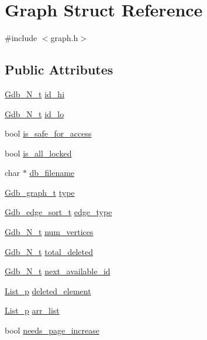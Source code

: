 \hypertarget{structGraph}{}\section{Graph Struct Reference}
\label{structGraph}


{\ttfamily \#include $<$graph.\+h$>$}

\subsection*{Public Attributes}
\begin{DoxyCompactItemize}
\item 
\hyperlink{primitives_8h_a859f3e5b0c42fd108b94dfb804f70440}{Gdb\+\_\+\+N\+\_\+t} \hyperlink{structGraph_a0224126d71d508a24e34f02cf646730b}{id\+\_\+hi}
\item 
\hyperlink{primitives_8h_a859f3e5b0c42fd108b94dfb804f70440}{Gdb\+\_\+\+N\+\_\+t} \hyperlink{structGraph_ab0318f9589f841d9a8bdad1413fddae5}{id\+\_\+lo}
\item 
bool \hyperlink{structGraph_ace0e0595c2240af59238f0767186a1b5}{is\+\_\+safe\+\_\+for\+\_\+access}
\item 
bool \hyperlink{structGraph_a1c7ee2bf3105480792f5b828c7c6b6f3}{is\+\_\+all\+\_\+locked}
\item 
char $\ast$ \hyperlink{structGraph_ac41ce58ccc9eee09e085dea4d8b28109}{db\+\_\+filename}
\item 
\hyperlink{primitives_8h_af1845dd201a1704a20a33f5b6c6e0fd2}{Gdb\+\_\+graph\+\_\+t} \hyperlink{structGraph_aa2ea9bdb6f466f17184c42a2dbca068f}{type}
\item 
\hyperlink{primitives_8h_aeaab1f0713a17e61d27d02e31f327be4}{Gdb\+\_\+edge\+\_\+sort\+\_\+t} \hyperlink{structGraph_abcebecd97e8916dd12100eb654754770}{edge\+\_\+type}
\item 
\hyperlink{primitives_8h_a859f3e5b0c42fd108b94dfb804f70440}{Gdb\+\_\+\+N\+\_\+t} \hyperlink{structGraph_a2ee8e26d64bc65ec8df12199817f36ee}{num\+\_\+vertices}
\item 
\hyperlink{primitives_8h_a859f3e5b0c42fd108b94dfb804f70440}{Gdb\+\_\+\+N\+\_\+t} \hyperlink{structGraph_adc026c1f3e912191160738438900f1cf}{total\+\_\+deleted}
\item 
\hyperlink{primitives_8h_a859f3e5b0c42fd108b94dfb804f70440}{Gdb\+\_\+\+N\+\_\+t} \hyperlink{structGraph_a71ca04f6b8639cb3c584814d50a04551}{next\+\_\+available\+\_\+id}
\item 
\hyperlink{graph_8h_aa777ed3c5a447d06c5b4a925f5557bd2}{List\+\_\+p} \hyperlink{structGraph_aa7caab218b6903b9ae69fd7040ea93ce}{deleted\+\_\+element}
\item 
\hyperlink{graph_8h_aa777ed3c5a447d06c5b4a925f5557bd2}{List\+\_\+p} \hyperlink{structGraph_ac64d6e4ef7d5114a3a62ab7af945899b}{arr\+\_\+list}
\item 
bool \hyperlink{structGraph_ad77c475406adfe028e8efcd30af31b14}{needs\+\_\+page\+\_\+increase}
\end{DoxyCompactItemize}


